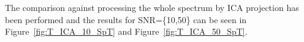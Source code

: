 {%
%
% 


The comparison against processing the whole spectrum by ICA projection 
has been performed and the results for SNR=\{10,50\} can be seen 
in Figure~\ref{fig:T_ICA_10_SpT} and Figure~\ref{fig:T_ICA_50_SpT}.

}
